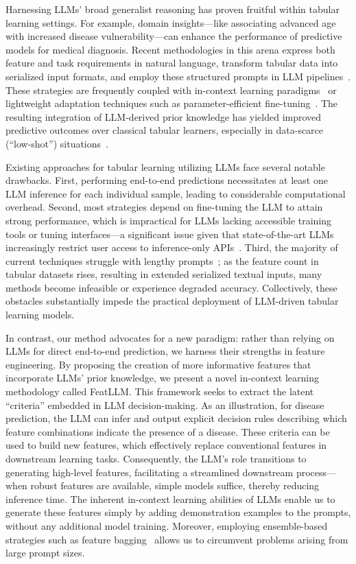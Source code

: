Harnessing LLMs’ broad generalist reasoning has proven fruitful within tabular learning settings. For example, domain insights—like associating advanced age with increased disease vulnerability—can enhance the performance of predictive models for medical diagnosis. Recent methodologies in this arena express both feature and task requirements in natural language, transform tabular data into serialized input formats, and employ these structured prompts in LLM pipelines~\cite{dinh2022lift,wang2023anypredict}. These strategies are frequently coupled with in-context learning paradigms~\cite{nam2023semi} or lightweight adaptation techniques such as parameter-efficient fine-tuning~\cite{dinh2022lift,hegselmann2023tabllm}. The resulting integration of LLM-derived prior knowledge has yielded improved predictive outcomes over classical tabular learners, especially in data-scarce (“low-shot”) situations~\cite{hegselmann2023tabllm}.

Existing approaches for tabular learning utilizing LLMs face several notable drawbacks. First, performing end-to-end predictions necessitates at least one LLM inference for each individual sample, leading to considerable computational overhead. Second, most strategies depend on fine-tuning the LLM to attain strong performance, which is impractical for LLMs lacking accessible training tools or tuning interfaces—a significant issue given that state-of-the-art LLMs increasingly restrict user access to inference-only APIs~\cite{anil2023palm,openai2023gpt4}. Third, the majority of current techniques struggle with lengthy prompts~\cite{liu2023lost}; as the feature count in tabular datasets rises, resulting in extended serialized textual inputs, many methods become infeasible or experience degraded accuracy. Collectively, these obstacles substantially impede the practical deployment of LLM-driven tabular learning models.

In contrast, our method advocates for a new paradigm: rather than relying on LLMs for direct end-to-end prediction, we harness their strengths in feature engineering. By proposing the creation of more informative features that incorporate LLMs’ prior knowledge, we present a novel in-context learning methodology called \textsf{FeatLLM}. This framework seeks to extract the latent “criteria” embedded in LLM decision-making. As an illustration, for disease prediction, the LLM can infer and output explicit decision rules describing which feature combinations indicate the presence of a disease. These criteria can be used to build new features, which effectively replace conventional features in downstream learning tasks. Consequently, the LLM’s role transitions to generating high-level features, facilitating a streamlined downstream process—when robust features are available, simple models suffice, thereby reducing inference time. The inherent in-context learning abilities of LLMs enable us to generate these features simply by adding demonstration examples to the prompts, without any additional model training. Moreover, employing ensemble-based strategies such as feature bagging~\cite{breiman2001random} allows us to circumvent problems arising from large prompt sizes.

